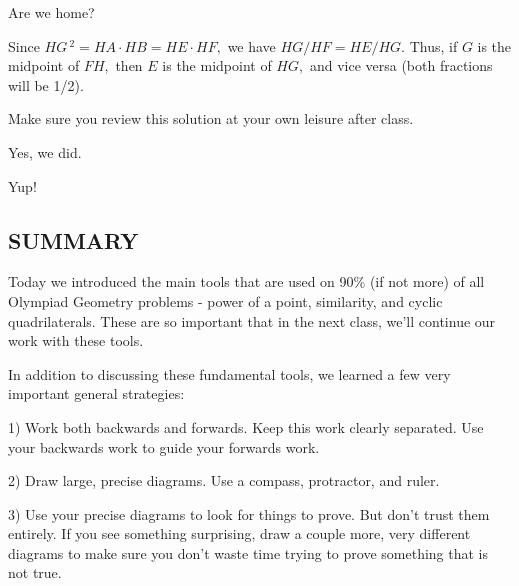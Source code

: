 Are we home?




Since $HG\,^2 = HA\cdot HB = HE\cdot HF,$ we have $HG/HF = HE/HG. $ Thus, if $G$ is the midpoint of $FH,$ then $E$ is the midpoint of $HG,$ and vice versa (both fractions will be 1/2).

Make sure you review this solution at your own leisure after class.


Yes, we did.


Yup! 

\subsection{SUMMARY}

Today we introduced the main tools that are used on 90\% (if not more) of all Olympiad Geometry problems - power of a point, similarity, and cyclic quadrilaterals. These are so important that in the next class, we'll continue our work with these tools.

In addition to discussing these fundamental tools, we learned a few very important general strategies:

1) Work both backwards and forwards. Keep this work clearly separated. Use your backwards work to guide your forwards work.

2) Draw large, precise diagrams. Use a compass, protractor, and ruler.

3) Use your precise diagrams to look for things to prove. But don't trust them entirely. If you see something surprising, draw a couple more, very different diagrams to make sure you don't waste time trying to prove something that is not true.

